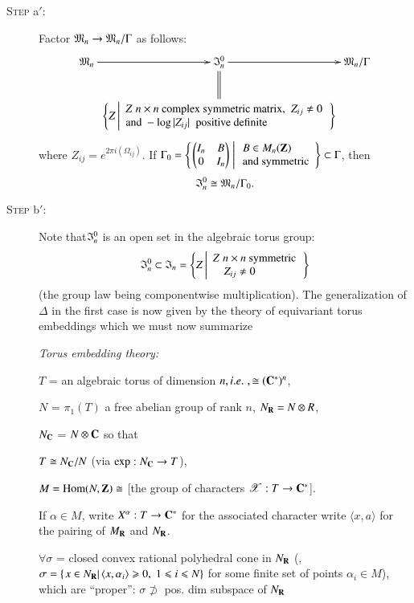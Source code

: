 \begin{description}
\item[\textsc{Step} a$'$:] Factor $\mathfrak{M}_n \to \mathfrak{M}_n / \Gamma$ as follows:
$$
\xymatrix@C=0.05cm{
\fM_n \ar[r]  &\fI^0_n \ar@{=}[d] \ar[r] &  \fM_n / \Gamma\\
& \left\{ Z  \left| 
\begin{array}{l}
Z \; n \times n \text{ complex symmetric matrix, } \; Z_{ij} \neq 0 \tabularnewline
\text{and } -\log |Z_{ij}| \; \text{ positive definite}
\end{array} 
\right.
\right\} & 
}
$$
where $Z_{ij} = e^{2\pi i(\Omega_{ij})}$. If $\Gamma_0 = \left\{ \left. \begin{pmatrix}I_n & B \\ 0 & I_n \end{pmatrix}\; \right| 
\begin{array}{l}
B \in M_n (\mathbf{Z})\\
\text{and symmetric}
\end{array}
 \right\} \subset \Gamma$, then
$$
\mathfrak{I}^0_n \cong \mathfrak{M}_n /\Gamma_0.
$$

\item[\textsc{Step} b$'$:] Note that\pageoriginale $\mathfrak{I}^0_n$ is an open set in the algebraic torus group:
$$
\mathfrak{I}^0_n \subset \mathfrak{I}_n = 
\left\{Z \left|\begin{array}{l}
Z \; n \times n \text{ symmetric}\\
\quad Z_{ij} \neq 0
\end{array}
\right. \right\}
$$
(the group law being componentwise multiplication). The generalization of $\Delta$ in the first case is now given by the theory of equivariant torus embeddings which we must now summarize

\noindent
\textit{Torus embedding theory:}

$T$ = an algebraic torus of dimension $n, {i.e.}\kern.3em, \cong (\mathbf{C}^\ast)^n$,

$N$ = $\pi_1 (T)$ a free abelian group of rank $n$, $N_{\mathbf{R}} = N\otimes R$, 

$N_{\mathbf{C}}$ = $N \otimes \mathbf{C}$ so that 

$T \cong N_{\mathbf{C}} / N$ (via $\exp : N_{\mathbf{C}} \to T$),

$M = \operatorname{Hom} (N , \mathbf{Z}) \cong$ [the group of characters $\mathscr{X}: T \to \mathbf{C}^\ast$].

If $\alpha \in M$, write $X^\alpha: T \to \mathbf{C}^\ast$ for the associated character write $\langle x, a\rangle$ for the pairing of $M_{\mathbf{R}}$ and $N_{\mathbf{R}}$.

$\forall \sigma$ = closed convex rational polyhedral cone in $N_{\mathbf{R}}$ (\ie, $\sigma = \{\left. x \in N_{\mathbf{R}} \right| \langle x, \alpha_i \rangle \geqslant 0, \; 1 \leqslant i \leqslant N\}$ for some finite set of points $\alpha_i \in M$), which are ``proper'': $\sigma \not\supset$ pos. dim subspace of $N_{\mathbf{R}}$


\end{description}

